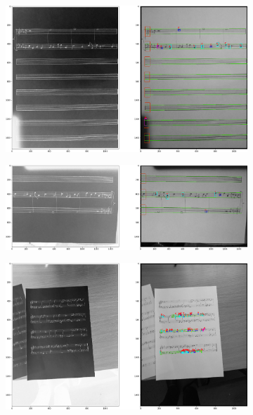 \documentclass[12pt]{article}
\begin{document}
\begin{enumerate}
\begin{figure}
\begin{subfigure}[b]{0.48\linewidth}
				\end{subfigure}
				\begin{subfigure}[b]{0.48\linewidth}
					\includegraphics[width=\linewidth]{Hard/Zdj14.png}
				\end{subfigure}
				\begin{subfigure}[b]{0.48\linewidth}
					\includegraphics[width=\linewidth]{Hard/Zdj15.png}
				\end{subfigure}
				\begin{subfigure}[b]{0.48\linewidth}
					\includegraphics[width=\linewidth]{Hard/Zdj16.png}

\end{subfigure}
\end{figure}
\end{enumerate}
\end{document}

